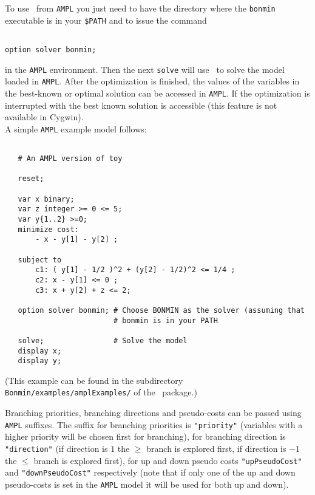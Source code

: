 To use \Bonmin\ from {\tt AMPL} you just need to have the directory where the
{\tt bonmin} executable is in your {\tt \$PATH} and to issue the
command

\begin{colorverb}
\begin{verbatim}

option solver bonmin;

\end{verbatim}
\end{colorverb}

in the {\tt AMPL} environment. Then the next {\tt solve} will
use \Bonmin\ to solve the model loaded in {\tt AMPL}.
After the optimization is finished, the values of the variables in the best-known
or optimal solution can be accessed in {\tt AMPL}. If the optimization is interrupted
with {\tt <CTRL-C>} the best known solution is accessible (this feature is not available in Cygwin).\\

A simple {\tt AMPL} example model follows:

\begin{colorverb}
\begin{verbatim}

   # An AMPL version of toy

   reset;

   var x binary;
   var z integer >= 0 <= 5;
   var y{1..2} >=0;
   minimize cost:
       - x - y[1] - y[2] ;

   subject to
       c1: ( y[1] - 1/2 )^2 + (y[2] - 1/2)^2 <= 1/4 ;
       c2: x - y[1] <= 0 ;
       c3: x + y[2] + z <= 2;

   option solver bonmin; # Choose BONMIN as the solver (assuming that
                         # bonmin is in your PATH

   solve;                # Solve the model
   display x;
   display y;

\end{verbatim}
\end{colorverb}

(This example can be found in the subdirectory {\tt Bonmin/examples/amplExamples/} of
the \Bonmin\ package.)

Branching priorities, branching directions and pseudo-costs can be passed using {\tt AMPL} suffixes.
The suffix for branching priorities is {\tt "priority"} (variables with a higher priority
will be chosen first for branching),
for branching direction is {\tt "direction"} (if direction is $1$ the $\geq$ branch
is explored first, if direction is $-1$ the $\leq$ branch is explored first), for up
and down pseudo costs {\tt "upPseudoCost"} and {\tt "downPseudoCost"} respectively
(note that if only one of the up and down pseudo-costs is set in the {\tt AMPL} model it will
be used for both up and down).\\

